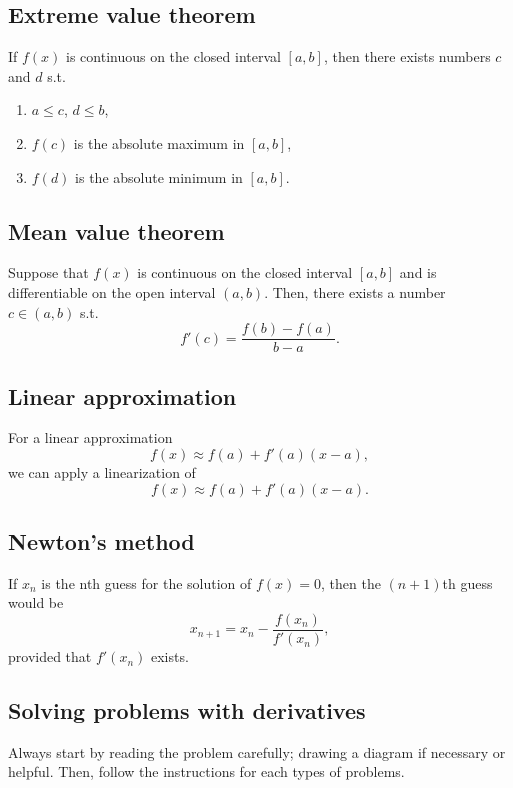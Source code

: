 \documentclass[main.tex]{subfiles}
\begin{document}
\begin{multicols}{2}
	\subsection*{Extreme value theorem}
	\begin{theorem}
	If \(f(x)\) is continuous on the closed interval \([a, b]\), then there exists numbers \(c\) and \(d\) s.t.
	\begin{enumerate}
		\item \(a \leq c\), \(d \leq b\),
		\item \(f(c)\) is the absolute maximum in \([a, b]\),
		\item \(f(d)\) is the absolute minimum in \([a, b]\).
	\end{enumerate}
	\end{theorem}

	\subsection*{Mean value theorem}
	\begin{theorem}
	Suppose that \(f(x)\) is continuous on the closed interval \([a, b]\) and is differentiable on the open interval \((a, b)\).
	Then, there exists a number \(c \in (a, b)\) s.t. \[f'(c) = \frac{f(b) - f(a)}{b - a}.\]
	\end{theorem}

	\subsection*{Linear approximation}
	For a linear approximation \[f(x) \approx f(a) + f'(a)(x - a),\] we can apply a linearization of \[f(x) \approx f(a) + f'(a)(x - a).\]

	\subsection*{Newton's method}
	\begin{definition}
	If \(x_n\) is the nth guess for the solution of \(f(x) = 0\), then the \((n + 1)\)th guess would be \[x_{n+1} = x_n - \frac{f(x_n)}{f'(x_n)},\] provided that \(f'(x_n)\) exists.
	\end{definition}

	\subsection*{Solving problems with derivatives}
	Always start by reading the problem carefully; drawing a diagram if necessary or helpful. Then, follow the instructions for each types of problems.

\end{multicols}
\end{document}
